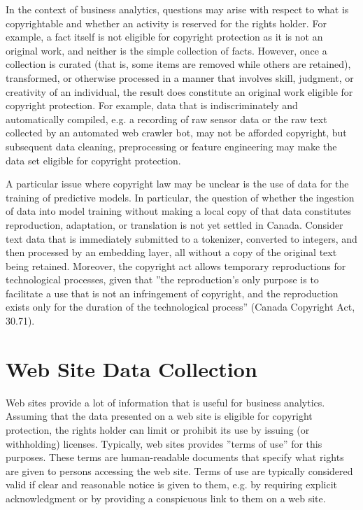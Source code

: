 In the context of business analytics, questions may arise with respect to what is copyrightable and whether an activity is reserved for the rights holder. For example, a fact itself is not eligible for copyright protection as it is not an original work, and neither is the simple collection of facts. However, once a collection is curated (that is, some items are removed while others are retained), transformed, or otherwise processed in a manner that involves skill, judgment, or creativity of an individual, the result does constitute an original work eligible for copyright protection. For example, data that is indiscriminately and automatically compiled, e.g. a recording of raw sensor data or the raw text collected by an automated web crawler bot, may not be afforded copyright, but subsequent data cleaning, preprocessing or feature engineering may make the data set eligible for copyright protection.

A particular issue where copyright law may be unclear is the use of data for the training of predictive models. In particular, the question of whether the ingestion of data into model training without making a local copy of that data constitutes reproduction, adaptation, or translation is not yet settled in Canada. Consider text data that is immediately submitted to a tokenizer, converted to integers, and then processed by an embedding layer, all without a copy of the original text being retained. Moreover, the copyright act allows temporary reproductions for technological processes, given that ''the reproduction's only purpose is to facilitate a use that is not an infringement of copyright, and the reproduction exists only for the duration of the technological process'' (Canada Copyright Act, 30.71).

\section{Web Site Data Collection}

Web sites provide a lot of information that is useful for business analytics. Assuming that the data presented on a web site is eligible for copyright protection, the rights holder can limit or prohibit its use by issuing (or withholding) licenses. Typically, web sites provides ''terms of use'' for this purposes. These terms are human-readable documents that specify what rights are given to persons accessing the web site. Terms of use are typically considered valid if clear and reasonable notice is given to them, e.g. by requiring explicit acknowledgment or by providing a conspicuous link to them on a web site. 

